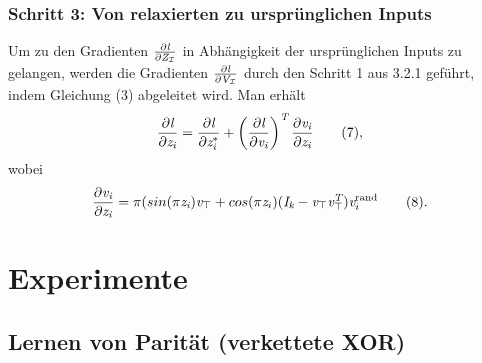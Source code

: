 \subsubsection{Schritt 3: Von relaxierten zu ursprünglichen Inputs}
Um zu den Gradienten $\frac{\partial\emph{l}}{\partial\emph{Z}_{\mathcal{I}}}$ in Abhängigkeit der ursprünglichen Inputs zu gelangen, werden die Gradienten $\frac{\partial\emph{l}}{\partial\emph{V}_{\mathcal{I}}}$ durch den Schritt 1 aus 3.2.1 geführt, indem Gleichung (3) abgeleitet wird. Man erhält
\[\frac{\partial\emph{l}}{\partial\emph{z}_{\emph{i}}} = \frac{\partial\emph{l}}{\partial\emph{z}_{\emph{i}}^*} + \left ( \frac{\partial \emph{l}}{\partial\emph{v}_{\emph{i}}} \right )^\emph{T} \frac{\partial\emph{v}_{\emph{i}}}{\partial\emph{z}_{\emph{i}}}\qquad(7), \]
wobei 
\[\frac{\partial\emph{v}_{\emph{i}}}{\partial\emph{z}_{\emph{i}}} = \pi(sin(\pi\emph{z}_{\emph{i}})\emph{v}_{\top} + cos(\pi\emph{z}_{i})(\emph{I}_{\emph{k}} - \emph{v}_{\top}\emph{v}_{\top}^\emph{T})\emph{v}_{i}^\text{rand}\qquad(8).\]
\cite[p.~5]{https://doi.org/10.48550/arxiv.1905.12149}



 

\section{Experimente}
\label{sec:results}



\subsection{Lernen von Parität (verkettete XOR)}
\label{subsec:xor}

